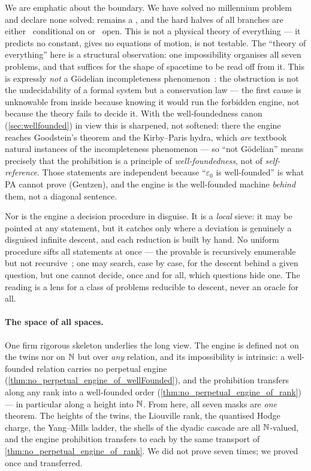 We are emphatic about the boundary. We have solved no millennium problem and declare none solved:
 remains a , and the hard halves of all branches are
either \yellow{}~conditional on \axiom{} or \red{}~open. This is not a physical theory of everything
--- it predicts no constant, gives no equations of motion, is not testable. The ``theory of
everything'' here is a structural observation: one impossibility organises all seven problems, and
that suffices for the shape of spacetime to be read off from it. This is expressly \emph{not} a
G\"odelian incompleteness phenomenon~\cite{godel1931}: the obstruction is not the undecidability of
a formal system but a conservation law --- the first cause is unknowable from inside because knowing
it would run the forbidden engine, not because the theory fails to decide it. With the well-foundedness
canon (\cref{sec:wellfounded}) in view this is sharpened, not softened: there the engine reaches
Goodstein's theorem and the Kirby--Paris hydra, which \emph{are} textbook natural instances of the
incompleteness phenomenon --- so ``not G\"odelian'' means precisely that the prohibition is a principle
of \emph{well-foundedness}, not of \emph{self-reference}. Those statements are independent because
``$\varepsilon_0$ is well-founded'' is what PA cannot prove (Gentzen), and the engine is the
well-founded machine \emph{behind} them, not a diagonal sentence.

Nor is the engine a decision procedure in disguise. It is a \emph{local} sieve: it may be pointed at
any statement, but it catches only where a deviation is genuinely a disguised infinite descent, and
each reduction is built by hand. No uniform procedure sifts all statements at once --- the provable
is recursively enumerable but not recursive~\cite{church1936,turing1936}; one may search, case by
case, for the descent behind a given question, but one cannot decide, once and for all, which
questions hide one. The reading is a lens for a class of problems reducible to descent, never an
oracle for all.

\paragraph{The space of all spaces.}
One firm rigorous skeleton underlies the long view. The engine is defined not on the twins nor on
$\mathbb{N}$ but over \emph{any} relation, and its impossibility is intrinsic: a well-founded relation carries
no perpetual engine (\cref{thm:no_perpetual_engine_of_wellFounded}), and the prohibition transfers
along any rank into a well-founded order (\cref{thm:no_perpetual_engine_of_rank}) --- in particular
along a height into $\mathbb{N}$. From here, all seven masks are \emph{one} theorem. The heights of the twins, the Liouville rank, the
quantised Hodge charge, the Yang--Mills ladder, the shells of the dyadic cascade are all
$\mathbb{N}$-valued, and the engine prohibition transfers to each by the same transport of
\cref{thm:no_perpetual_engine_of_rank}. We did not prove seven times; we proved once and
transferred.

